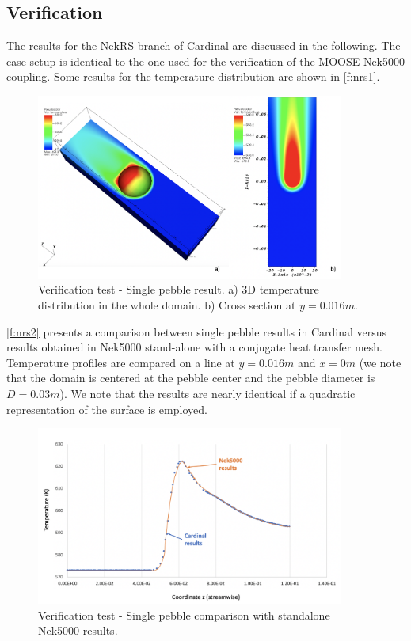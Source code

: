 \subsection{Verification}
\label{s:nrs1}

The results for the NekRS branch of Cardinal are discussed in the following.
The case setup is identical to the one used for the verification of the MOOSE-Nek5000 coupling.
Some results for the temperature distribution are shown in \autoref{f:nrs1}.

\begin{figure}[htb!]
\centering
\includegraphics[clip=true,width=0.9\textwidth]{Figures/nrs_vv1}
\caption{Verification test - Single pebble result. a) 3D temperature distribution in the whole domain. b) Cross section at $y=0.016 m$.}
\label{f:nrs1}
\end{figure}

\autoref{f:nrs2} presents a comparison between single pebble results in Cardinal versus results obtained in Nek5000 stand-alone with a conjugate heat transfer mesh. Temperature profiles are compared on a line at $y=0.016 m$ and $x=0 m$ (we note that the domain is centered at the pebble center and the pebble diameter is $D=0.03 m$). We note that the results are nearly identical if a quadratic representation of the surface is employed.

\begin{figure}[htb!]
\centering
\includegraphics[clip=true,width=0.9\textwidth]{Figures/nrs_vv2}
\caption{Verification test - Single pebble comparison with standalone Nek5000 results. }
\label{f:nrs2}
\end{figure}
